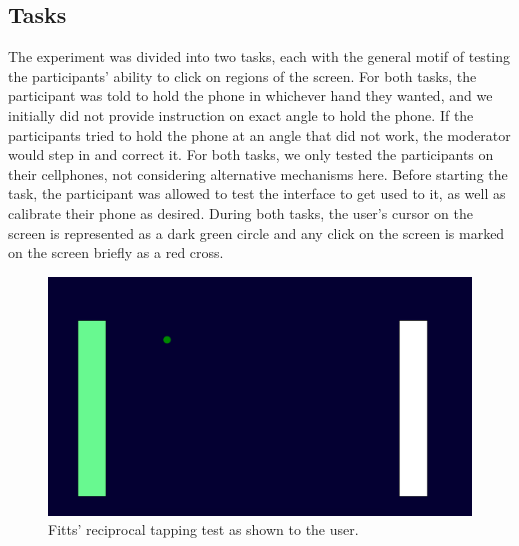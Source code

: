 \subsection{Tasks}

The experiment was divided into two tasks, each with the general motif of testing
the participants' ability to click on regions of the screen. For both tasks, the
participant was told to hold the phone in whichever hand they wanted, and we
initially did not provide instruction on exact angle to hold the phone. If the
participants tried to hold the phone at an angle that did not work, the moderator
would step in and correct it. For both tasks, we only tested the participants
on their cellphones, not considering alternative mechanisms here. Before starting
the task, the participant was allowed to test the interface to get used to it,
as well as calibrate their phone as desired. During both tasks, the user's
cursor on the screen is represented as a dark green circle and any click on the
screen is marked on the screen briefly as a red cross.

\begin{figure}
\centering
  \includegraphics[width=0.6\columnwidth]{chapters/04_muifold/figures/user_study_fitts.png}
  \caption{Fitts' reciprocal tapping test as shown to the user.}
  \label{fig:user_study_fitts}
\end{figure}

